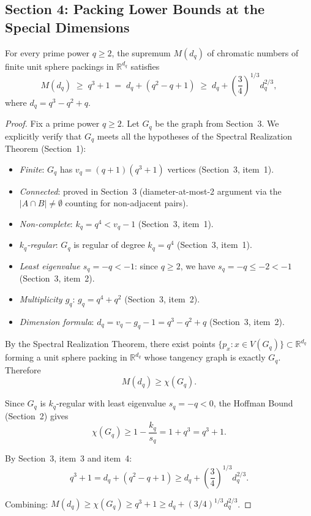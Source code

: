 \subsection*{Section 4: Packing Lower Bounds at the Special Dimensions}

\begin{theorem}
\label{thm:main-packing}
For every prime power $q\ge 2$, the supremum $M(d_q)$ of chromatic numbers of finite unit sphere packings in $\mathbb{R}^{d_q}$ satisfies
\[
  M(d_q)\;\ge\; q^3+1 \;=\; d_q + (q^2-q+1) \;\ge\; d_q+\left(\frac{3}{4}\right)^{1/3}d_q^{2/3},
\]
where $d_q = q^3-q^2+q$.
\end{theorem}

\begin{proof}
Fix a prime power $q\ge 2$. Let $G_q$ be the graph from Section~3. We explicitly verify that $G_q$ meets all the hypotheses of the Spectral Realization Theorem (Section~1):
\begin{itemize}
  \item \emph{Finite}: $G_q$ has $v_q=(q+1)(q^3+1)$ vertices (Section~3, item~1).
  \item \emph{Connected}: proved in Section~3 (diameter-at-most-2 argument via the $|A\cap B|\ne\emptyset$ counting for non-adjacent pairs).
  \item \emph{Non-complete}: $k_q=q^4<v_q-1$ (Section~3, item~1).
  \item \emph{$k_q$-regular}: $G_q$ is regular of degree $k_q=q^4$ (Section~3, item~1).
  \item \emph{Least eigenvalue $s_q=-q<-1$}: since $q\ge 2$, we have $s_q=-q\le -2<-1$ (Section~3, item~2).
  \item \emph{Multiplicity $g_q$}: $g_q=q^4+q^2$ (Section~3, item~2).
  \item \emph{Dimension formula}: $d_q=v_q-g_q-1=q^3-q^2+q$ (Section~3, item~2).
\end{itemize}
By the Spectral Realization Theorem, there exist points $\{p_x:x\in V(G_q)\}\subset\mathbb{R}^{d_q}$ forming a unit sphere packing in $\mathbb{R}^{d_q}$ whose tangency graph is exactly $G_q$. Therefore
\[
M(d_q)\ge\chi(G_q).
\]

Since $G_q$ is $k_q$-regular with least eigenvalue $s_q=-q<0$, the Hoffman Bound (Section~2) gives
\[
\chi(G_q)\ge 1-\frac{k_q}{s_q}=1+q^3=q^3+1.
\]

By Section~3, item~3 and item~4:
\[
q^3+1=d_q+(q^2-q+1)\ge d_q+\left(\frac{3}{4}\right)^{1/3}d_q^{2/3}.
\]

Combining: $M(d_q)\ge\chi(G_q)\ge q^3+1\ge d_q+(3/4)^{1/3}d_q^{2/3}$.
\end{proof}

